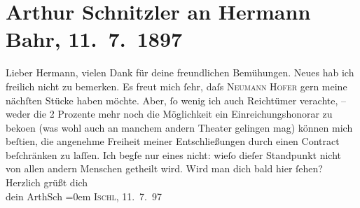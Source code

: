 

         
         \renewcommand{\erwaehntePersonen}{Personen: Hermann Bahr, Gilbert Otto Neumann-Hofer}
         \renewcommand{\erwaehnteOrte}{Orte: Bad Ischl, Wien}
         \renewcommand{\erwaehnteWerke}{}
               \section[Arthur Schnitzler an Hermann Bahr, 11. 7. 1897]{ Arthur Schnitzler an Hermann Bahr, 11. 7. 1897}\nopagebreak{}\rehead{ }\begin{ledgroupsized}[t]{13cm}\normalsize\beginnumbering{} \toendnotes[C]{\smallbreak\pagebreak[2]} 
\pstart{}{\pb}Lieber Hermann,
               \pend\pstart
           vielen Dank für deine freundlichen Bemühungen. Neues hab ich freilich nicht zu
               bemerken. Es freut mich ſehr, daſs \textsc{Neumann Hofer} gern meine nächſten Stücke haben möchte. Aber, ſo wenig {\pb}ich auch Reichtümer
               verachte, – weder die 2 Prozente mehr noch die Möglichkeit ein Einreichungshonorar zu
                  beko{\geminationm}en (was wohl auch an manchem andern Theater
               gelingen mag) können mich beſti{\geminationm}en, die angenehme
               Freiheit meiner Entschließungen durch einen Contract beſchränken zu laſſen. {\pb}Ich begfe nur eines nicht: wieſo dieſer Standpunkt nicht von allen andern Menschen
               getheilt wird.\pend
           \pstart
           Wird man dich bald hier ſehen?\pend
           \pstart
           Herzlich grüßt dich{\\[\baselineskip]}dein \spacefill\mbox{ArthSch}\pend
           \leftskip=0em{}\pstart
           \textsc{Ischl, 11. 7. 97}\pend
           
         
         \endnumbering{}\end{ledgroupsized}  \newcommand{\dateiname}{L00699}\newcommand{\titel}{Arthur Schnitzler an Hermann Bahr, 11. 7. 1897}\newcommand{\editorInnen}{ Kurt Ifkovits,  Martin Anton Müller}
      
